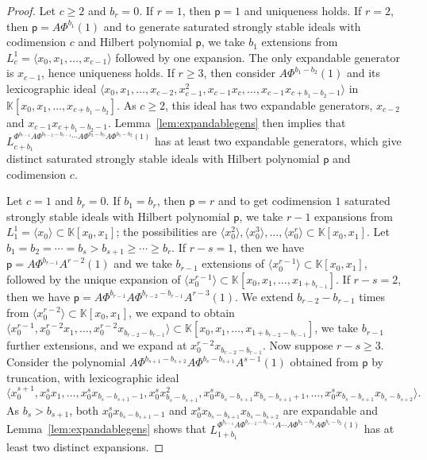 \documentclass[12pt]{amsart}%
\theoremstyle{definition}%
\newcommand{\hp}{\mathsf{p}}%
\newcommand{\lift}{\Phi}%
\newcommand{\plus}{A}%
\newcommand{\kk}{\mathbb{K}}%
\begin{document}
\begin{proof}
  Let $c \ge 2$ and $b_r = 0$.  If $r = 1$, then $\hp = 1$ and
  uniqueness holds.  If $r = 2$, then $\hp = \plus \lift^{b_1} (1)$
  and to generate saturated strongly stable ideals with codimension
  $c$ and Hilbert polynomial $\hp$, we take $b_1$ extensions from
  $L^{1}_c = \langle x_0, x_1, \dotsc, x_{c-1} \rangle$ followed by
  one expansion.  The only expandable generator is $x_{c-1}$, hence
  uniqueness holds.  If $r \ge 3$, then consider $\plus \lift^{b_{1} -
    b_{2}} (1)$ and its lexicographic ideal $ \langle x_0, x_1,
  \dotsc, x_{c-2}, x_{c-1}^2, x_{c-1}x_{c}, \dotsc, x_{c-1} x_{c + b_1
    - b_2 - 1} \rangle$ in $\kk[x_0, x_1, \dotsc, x_{c + b_1 - b_2}]$.
  As $c \ge 2$, this ideal has two expandable generators, $x_{c-2}$
  and $x_{c-1} x_{c + b_1 - b_2 - 1}$.  Lemma~\ref{lem:expandablegens}
  then implies that $ L^{\lift^{b_{r-1}} \plus \lift^{b_{r-2} -
      b_{r-1}} \dotsb \plus \lift^{b_2 - b_3} \plus \lift^{b_1 - b_2}
    (1)}_{c + b_1}$ has at least two expandable generators, which give
  distinct saturated strongly stable ideals with Hilbert polynomial
  $\hp$ and codimension $c$.

  Let $c = 1$ and $b_r = 0$.  If $b_1 = b_r$, then $\hp = r$ and to
  get codimension $1$ saturated strongly stable ideals with Hilbert
  polynomial $\hp$, we take $r - 1$ expansions from $L^1_1 = \langle
  x_0 \rangle \subset \kk[x_0, x_1]$; the possibilities are $\langle
  x_0^2 \rangle, \langle x_0^3 \rangle, \dotsc, \langle x_0^{r}
  \rangle \subset \kk[x_0, x_1]$.  Let $b_1 = b_2 = \dotsb = b_{s} >
  b_{s+1} \ge \dotsb \ge b_r$.  If $r - s = 1$, then we have $\hp =
  \plus \lift^{b_{r-1}} \plus^{r-2} (1)$ and we take $b_{r-1}$
  extensions of $\langle x_0^{r-1} \rangle \subset \kk[x_0, x_1]$,
  followed by the unique expansion of $\langle x_0^{r-1} \rangle
  \subset \kk[x_0, x_1, \dotsc, x_{1+b_{r-1}}]$.  If $r - s = 2$, then
  we have $\hp = \plus \lift^{b_{r-1}} \plus \lift^{b_{r-2} - b_{r-1}}
  \plus^{r-3} (1)$.  We extend $b_{r-2} - b_{r-1}$ times from $\langle
  x_0^{r-2} \rangle \subset \kk[x_0, x_1]$, we expand to obtain
  $\langle x_0^{r-1}, x_0^{r-2} x_1, \dotsc, x_0^{r-2} x_{b_{r-2} -
    b_{r-1}} \rangle \subset \kk[x_0, x_1, \dotsc, x_{1 + b_{r-2} -
      b_{r-1}}]$, we take $b_{r-1}$ further extensions, and we expand
  at $x_0^{r-2} x_{b_{r-2} - b_{r-1}}$.  Now suppose $r - s \ge 3$.
  Consider the polynomial $ \plus \lift^{b_{s+1} - b_{s+2}} \plus
  \lift^{b_{s} - b_{s+1}} \plus^{s-1} (1) $ obtained from $\hp$ by
  truncation, with lexicographic ideal
  \[
  \langle x_0^{s+1}, x_0^{s} x_1, \dotsc, x_0^{s} x_{b_{s} - b_{s+1} -
    1}, x_0^{s} x_{b_{s} - b_{s+1}}^2, x_0^{s} x_{b_{s} - b_{s+1}}
  x_{b_{s} - b_{s+1} + 1}, \dotsc, x_0^{s} x_{b_{s} - b_{s+1}}
  x_{b_{s} - b_{s+2}} \rangle .
  \]
  As $b_s > b_{s+1}$, both $x_0^{s} x_{b_{s} - b_{s+1} - 1}$ and
  $x_0^{s} x_{b_{s} - b_{s+1}} x_{b_{s} - b_{s+2}}$ are expandable and
  Lemma~\ref{lem:expandablegens} shows that $ L^{\lift^{b_{r-1}} \plus
    \lift^{b_{r-2} - b_{r-1}} \plus \dotsb \plus \lift^{b_2 - b_3}
    \plus \lift^{b_1 - b_2} (1)}_{1 + b_1}$ has at least two distinct
  expansions.  \qedhere
\end{proof}
\end{document}
